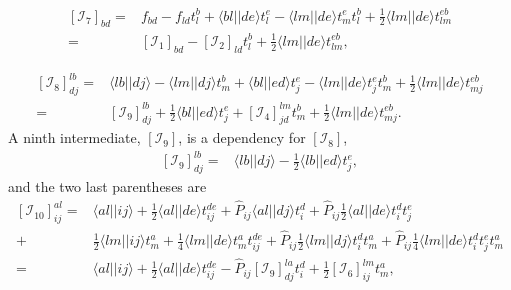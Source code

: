 \begin{equation}
\begin{split}
\left[\mathcal{I}_7\right]_{bd} 
=& 
f_{bd} - f_{ld} t_l^b + \langle bl||de \rangle t_l^e - \langle lm||de \rangle t_m^e t_l^b 
+ \frac{1}{2} \langle lm||de \rangle t_{lm}^{eb}
\\
=& 
\left[\mathcal{I}_1\right]_{bd} - \left[\mathcal{I}_2\right]_{ld} t_l^b 
+ \frac{1}{2} \langle lm||de \rangle t_{lm}^{eb},
\end{split}
\end{equation}

\begin{equation}
\begin{split}
\left[\mathcal{I}_8\right]_{dj}^{lb}
=&
\langle lb||dj \rangle - \langle lm||dj \rangle t_{m}^b + \langle bl||ed \rangle t_{j}^e
- \langle lm||de \rangle t_j^e t_m^b + \frac{1}{2} \langle lm||de \rangle t_{mj}^{eb}
\\
=&
\left[\mathcal{I}_9\right]_{dj}^{lb}
+ \frac{1}{2} \langle bl||ed \rangle t_{j}^e
+ \left[\mathcal{I}_4\right]_{jd}^{lm} t_m^b 
+ \frac{1}{2} \langle lm||de \rangle t_{mj}^{eb}.
\end{split}
\end{equation}
A ninth intermediate, $\left[\mathcal{I}_9\right]$, is a dependency for $\left[\mathcal{I}_8\right]$,
\begin{equation}
\begin{split}
\left[\mathcal{I}_9\right]_{dj}^{lb}
=& \langle lb||dj \rangle - \frac{1}{2} \langle lb||ed \rangle t_j^e ,
\end{split}
\end{equation}
and the two last parentheses are
\begin{equation}
\begin{split}
\left[\mathcal{I}_{10}\right]_{ij}^{al}
=&
\langle al||ij \rangle + \frac{1}{2} \langle al||de \rangle t_{ij}^{de} 
+ \hat{P}_{ij} \langle al||dj \rangle t_i^d 
+ \hat{P}_{ij} \frac{1}{2} \langle al||de \rangle t_i^d t_j^e  
\\
+& \frac{1}{2} \langle lm||ij \rangle t_m^a
+ \frac{1}{4} \langle lm||de \rangle t_m^a t_{ij}^{de} 
+ \hat{P}_{ij} \frac{1}{2} \langle lm||dj \rangle t_i^d t_m^a
+ \hat{P}_{ij} \frac{1}{4} \langle lm||de \rangle t_i^d t_j^e t_m^a
\\
=&
\langle al||ij \rangle + \frac{1}{2} \langle al||de \rangle t_{ij}^{de} 
- \hat{P}_{ij} \left[\mathcal{I}_9\right]_{dj}^{la}  t_i^d
  + \frac{1}{2}\left[\mathcal{I}_6\right]_{ij}^{lm} t_m^a ,
\end{split}
\end{equation}
